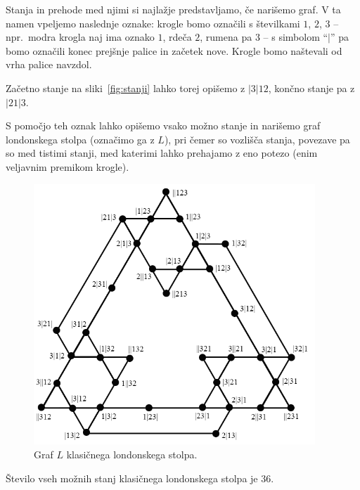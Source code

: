 \documentclass[twoside,11pt]{article}
\begin{document}
Stanja in prehode med njimi si najlažje predstavljamo, če narišemo graf. V ta namen vpeljemo naslednje oznake:
krogle bomo označili s številkami $1$, $2$, $3$ -- npr.\ modra krogla naj ima oznako $1$, rdeča $2$, rumena pa $3$ -- s simbolom ``$|$'' pa bomo označili konec prejšnje palice in začetek nove. Krogle bomo naštevali od vrha palice navzdol.

\begin{primer}
    Začetno stanje na sliki~\ref{fig:stanji} lahko torej opišemo z $|3|12$, končno stanje pa z $|21|3$.
\end{primer}

S pomočjo teh oznak lahko opišemo vsako možno stanje in narišemo graf londonskega stolpa (označimo ga z $L$), pri čemer so vozlišča stanja, povezave pa so med tistimi stanji, med katerimi lahko prehajamo z eno potezo (enim veljavnim premikom krogle).

\begin{figure}[h!]
    \centering
    \includegraphics[width=300pt]{img/classic-tolgraph.png}
    \caption{Graf $L$ klasičnega londonskega stolpa.}
    \label{fig:tolgraph}
\end{figure}

\begin{lema}
    \label{lem:stanja-klas-lond}
    Število vseh možnih stanj klasičnega londonskega stolpa je 36.
\end{lema}
\end{document}
